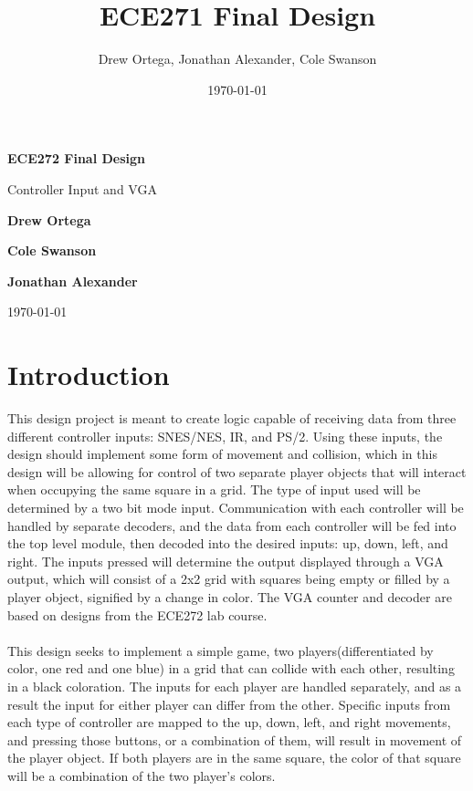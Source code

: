 \documentclass[]{article}
\title{ECE271 Final Design}
\author{Drew Ortega, Jonathan Alexander, Cole Swanson}
\date{\today}
\begin{document}
\begin{titlepage}
    \begin{center}
        \vspace*{1cm}
 
        \Huge
        \textbf{ECE272 Final Design}
 
        \vspace{0.5cm}
        \LARGE
        Controller Input and VGA
 
        \vspace{1.5cm}
 
        \textbf{Drew Ortega}
        
        \textbf{Cole Swanson}
        
        \textbf{Jonathan Alexander}
 
 		\vspace{0.5cm}
        \today
 
    \end{center}
\end{titlepage}

\newpage
	\tableofcontents
\newpage

\section{Introduction}
This design project is meant to create logic capable of receiving data from three different controller inputs: SNES/NES, IR, and PS/2.
Using these inputs, the design should implement some form of movement and collision, which in this design will be allowing for control of two separate player objects that will interact when occupying the same square in a grid.
The type of input used will be determined by a two bit mode input.
Communication with each controller will be handled by separate decoders, and the data from each controller will be fed into the top level module, then decoded into the desired inputs: up, down, left, and right.
The inputs pressed will determine the output displayed through a VGA output, which will consist of a 2x2 grid with squares being empty or filled by a player object, signified by a change in color.
The VGA counter and decoder are based on designs from the ECE272 lab course. \\~\\
This design seeks to implement a simple game, two players(differentiated by color, one red and one blue) in a grid that can collide with each other, resulting in a black coloration.
The inputs for each player are handled separately, and as a result the input for either player can differ from the other.
Specific inputs from each type of controller are mapped to the up, down, left, and right movements, and pressing those buttons, or a combination of them, will result in movement of the player object.
If both players are in the same square, the color of that square will be a combination of the two player's colors. 
\end{document}
